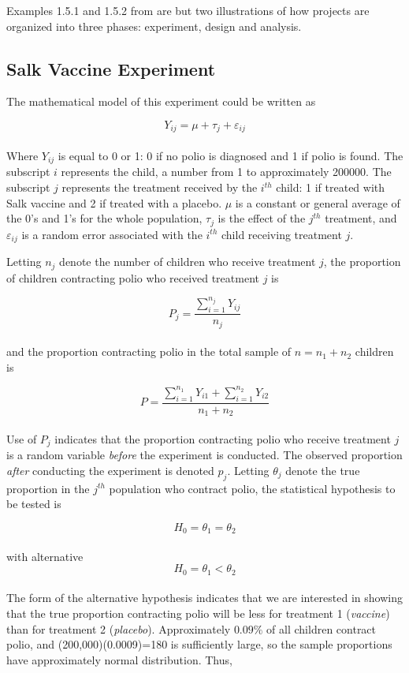 \documentclass{WileySev}
\begin{document}
Examples 1.5.1 and 1.5.2 from \cite{hicks1999fundamental} are but two illustrations of how projects are organized into three phases: experiment, design and analysis.

\subsection{Salk Vaccine Experiment}

The mathematical model of this experiment could be written as

\begin{equation}
Y_{ij}= \mu+\tau_j+\varepsilon_{ij} \label{eq:2} %
\end{equation}
\\
Where $Y_{ij}$ is equal to 0 or 1: 0 if no polio is diagnosed and 1 if polio is found. The subscript
$i$ represents the child, a number from 1 to approximately 200000. The subscript $j$ represents the treatment received by the $i^{th}$ child: 1 if treated with Salk vaccine and 2 if treated with a placebo. $\mu$ is a constant or general average of the 0's and 1's for the whole population, $\tau_j$ is the effect of the $j^{th}$ treatment, and $\varepsilon_{ij}$ is a random error associated with the $i^{th}$ child receiving treatment $j$.

 Letting $n_j$ denote the number of children who receive treatment $j$, the proportion of children contracting polio who received treatment $j$ is

 \begin{equation}
P_j=\frac{\sum_{i=1}^{n_j} Y_{ij}}{n_j}\label{eq:3}
 \end{equation}
\\
and the proportion contracting polio in the total sample of $n=n_1+n_2$ children is 

\begin{equation}
P=\frac{\sum_{i=1}^{n_1} Y_{i1} + \sum_{i=1}^{n_2} Y_{i2}}{n_1 + n_2}\label{eq:4}
\end{equation}
\\
Use of $P_j$ indicates that the proportion contracting polio who receive treatment $j$ is a random variable \textit{before} the experiment is conducted. The observed proportion  \textit{after} conducting the experiment is denoted $p_j$.
Letting $\theta_j$ denote the true proportion in the $j^{th}$ population who contract polio, the statistical hypothesis to be tested is

\begin{equation}
H_0=\theta_1=\theta_2
\end{equation}
\\
with alternative
\begin{equation}
H_0=\theta_1<\theta_2
\end{equation}
\\
The form of the alternative hypothesis indicates that we are interested in showing that the true proportion contracting polio will be less for treatment 1 (\textit{vaccine}) than for treatment 2 (\textit{placebo}).
Approximately $0.09\%$ of all children contract polio, and (200,000)(0.0009)=180 is sufficiently large, so the sample proportions have approximately normal distribution. Thus,
\end{document}
